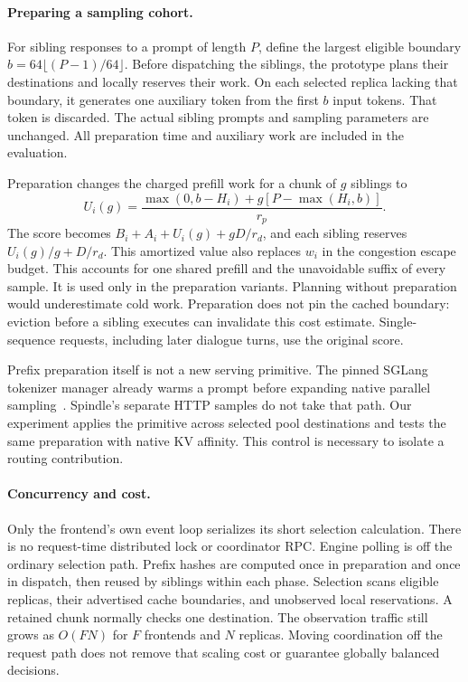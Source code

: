 \paragraph{Preparing a sampling cohort.}
For sibling responses to a prompt of length $P$, define the largest eligible
boundary $b=64\lfloor(P-1)/64\rfloor$. Before dispatching the siblings, the
prototype plans their destinations and locally reserves their work. On each
selected replica lacking that boundary, it generates one auxiliary token from
the first $b$ input tokens. That token is discarded. The actual sibling prompts
and sampling parameters are unchanged. All preparation time and auxiliary work
are included in the evaluation.

Preparation changes the charged prefill work for a chunk of $g$ siblings to
\begin{equation}
 U_i(g)=\frac{\max(0,b-H_i)+g[P-\max(H_i,b)]}{r_p}.
\end{equation}
The score becomes $B_i+A_i+U_i(g)+gD/r_d$, and each sibling reserves
$U_i(g)/g+D/r_d$. This amortized value also replaces $w_i$ in the congestion
escape budget. This accounts for one shared prefill and the unavoidable
suffix of every sample. It is used only in the preparation variants. Planning
without preparation would underestimate cold work. Preparation does not pin the
cached boundary: eviction before a sibling executes can invalidate this cost
estimate. Single-sequence requests,
including later dialogue turns, use the original score.

Prefix preparation itself is not a new serving primitive. The pinned SGLang
tokenizer manager already warms a prompt before expanding native parallel
sampling~\cite{sglang}. Spindle's separate HTTP samples do not take that path.
Our experiment applies the primitive across selected pool destinations and
tests the same preparation with native KV affinity. This control is necessary
to isolate a routing contribution.

\paragraph{Concurrency and cost.}
Only the frontend's own event loop serializes its short selection calculation.
There is no request-time distributed lock or coordinator RPC. Engine polling is
off the ordinary selection path. Prefix hashes are computed once in preparation
and once in dispatch, then reused by siblings within each phase.
Selection scans eligible replicas, their advertised cache boundaries, and
unobserved local reservations. A retained chunk normally checks one destination.
The observation traffic still grows as $O(FN)$ for $F$ frontends and $N$
replicas. Moving coordination off the request path does not remove that scaling
cost or guarantee globally balanced decisions.
